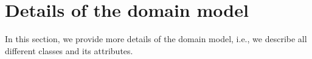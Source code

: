 \section{Details of the domain model}
\label{sec:appendix domain model}

In this section, we provide more details of the domain model, i.e., we describe all different classes and its attributes.
